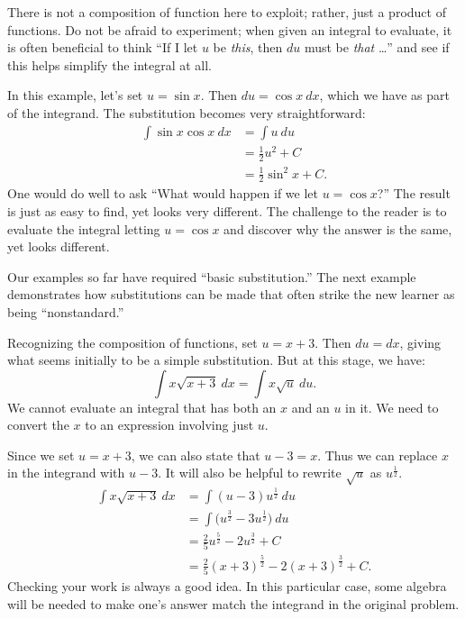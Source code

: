 {There is not a composition of function here to exploit; rather, just a product of functions. Do not be afraid to experiment; when given an integral to evaluate, it is often beneficial to think ``If I let $u$ be \textit{this}, then $du$ must be \textit{that} \ldots'' and see if this helps simplify the integral at all.

In this example, let's set $u = \sin x$. Then $du = \cos x\ dx$, which we have as part of the integrand. The substitution becomes very straightforward:
\begin{align*}
	\int \sin x\cos x\ dx
	&=	\int u\ du \\
	&= \frac12u^2+ C \\
	&= \frac12\sin^2 x + C.
\end{align*}
One would do well to ask ``What would happen if we let $u = \cos x$?'' The result is just as easy to find, yet looks very different. The challenge to the reader is to evaluate the integral letting $u = \cos x$ and discover why the answer is the same, yet looks different.}

Our examples so far have required ``basic substitution.'' The next example demonstrates how substitutions can be made that often strike the new learner as being ``nonstandard.''

{Recognizing the composition of functions, set $u = x+3$. Then $du = dx$, giving what seems initially to be a simple substitution. But at this stage, we have:
	$$\int x\sqrt{x+3}\ dx = \int x\sqrt{u}\ du.$$
We cannot evaluate an integral that has both an $x$ and an $u$ in it. We need to convert the $x$ to an expression involving just $u$.

Since we set $u = x+3$, we can also state that $u-3 = x$. Thus we can replace $x$ in the integrand with $u-3$. It will also be helpful to rewrite $\sqrt{u}$ as $u^\frac12$.
\begin{align*}
	\int x\sqrt{x+3} \ dx
	&= \int (u-3)u^\frac12\ du \\
	&= \int \big(u^\frac32 - 3u^\frac12\big) \ du \\
	&= \frac25u^\frac52 - 2u^\frac32 + C \\
	&= \frac25(x+3)^\frac52 - 2(x+3)^\frac32 + C.
\end{align*}
Checking your work is always a good idea. In this particular case, some algebra will be needed to make one's answer match the integrand in the original problem.}

